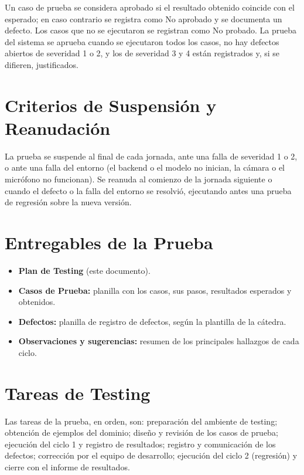 \documentclass[12pt, a4paper]{article}
\begin{document}
Un caso de prueba se considera aprobado si el resultado obtenido coincide con
el esperado; en caso contrario se registra como No aprobado y se documenta un
defecto. Los casos que no se ejecutaron se registran como No probado. La
prueba del sistema se aprueba cuando se ejecutaron todos los casos, no hay
defectos abiertos de severidad 1 o 2, y los de severidad 3 y 4 están
registrados y, si se difieren, justificados.

\section{Criterios de Suspensión y Reanudación}

La prueba se suspende al final de cada jornada, ante una falla de severidad 1 o
2, o ante una falla del entorno (el backend o el modelo no inician, la cámara o
el micrófono no funcionan). Se reanuda al comienzo de la jornada siguiente o
cuando el defecto o la falla del entorno se resolvió, ejecutando antes una
prueba de regresión sobre la nueva versión.

\section{Entregables de la Prueba}

\begin{itemize}
    \item \textbf{Plan de Testing} (este documento).
    \item \textbf{Casos de Prueba:} planilla con los casos, sus pasos, resultados esperados y obtenidos.
    \item \textbf{Defectos:} planilla de registro de defectos, según la plantilla de la cátedra.
    \item \textbf{Observaciones y sugerencias:} resumen de los principales hallazgos de cada ciclo.
\end{itemize}

\section{Tareas de Testing}

Las tareas de la prueba, en orden, son: preparación del ambiente de testing;
obtención de ejemplos del dominio; diseño y revisión de los casos de prueba;
ejecución del ciclo 1 y registro de resultados; registro y comunicación de los
defectos; corrección por el equipo de desarrollo; ejecución del ciclo 2
(regresión) y cierre con el informe de resultados.
\end{document}

